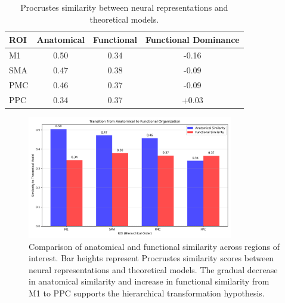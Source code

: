 \documentclass{article}
\begin{document}
\begin{table}[h]
\centering
\small
\begin{tabular}{|l|c|c|c|}
\hline
\textbf{ROI} & \textbf{Anatomical} & \textbf{Functional} & \textbf{Functional Dominance} \\
\hline
M1 & 0.50 & 0.34 & -0.16 \\
SMA & 0.47 & 0.38 & -0.09 \\
PMC & 0.46 & 0.37 & -0.09 \\
PPC & 0.34 & 0.37 & +0.03 \\
\hline
\end{tabular}
\caption{Procrustes similarity between neural representations and theoretical models.}
\label{tab:procrustes}
\end{table}

\begin{figure}[!htbp]
\centering
\includegraphics[width=0.8\textwidth]{results/goal_dual/anatomical_functional_similarity.png}
\caption{Comparison of anatomical and functional similarity across regions of interest. Bar heights represent Procrustes similarity scores between neural representations and theoretical models. The gradual decrease in anatomical similarity and increase in functional similarity from M1 to PPC supports the hierarchical transformation hypothesis.}
\label{fig:procrustes_comparison}
\end{figure}


\end{document}
